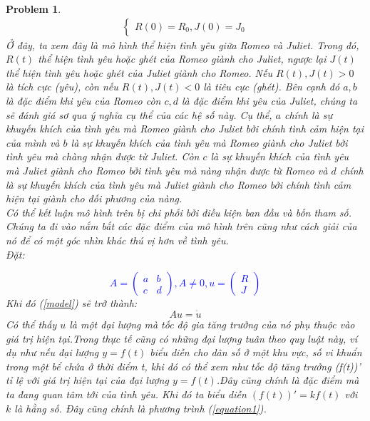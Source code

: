 \documentclass[a4paper]{article}
\newtheorem*{problem}{Problem}
\begin{document}
\begin{problem}
{\begin{align}
\begin{cases}
        R(0)=R_0,J(0)=J_0
        \end{cases}\tag{*}
    \end{align}
    }
   Ở đây, ta xem đây là mô hình thể hiện tình yêu giữa Romeo và Juliet. Trong đó, $R(t)$ thể hiện tình yêu hoặc ghét của Romeo giành cho Juliet, ngược lại $J(t)$thể hiện tình yêu hoặc ghét của Juliet giành cho Romeo. Nếu $R(t),J(t) > 0$ là tích cực (yêu), còn nếu $R(t), J(t) <0$  là tiêu cực (ghét). Bên cạnh đó $a,b$ là đặc điểm khi yêu của Romeo còn $c,d$ là đặc điểm khi yêu của Juliet, chúng ta sẽ đánh giá sơ qua ý nghĩa cụ thể của các hệ số này. Cụ thể, $a$ chính là sự khuyến khích của tình yêu mà Romeo giành cho Juliet bởi chính tình cảm hiện tại của mình và $b$ là sự khuyến khích của tình yêu mà Romeo giành cho Juliet bởi tình yêu mà chàng nhận được từ Juliet. Còn $c$ là sự khuyến khích của tình yêu mà Juliet giành cho Romeo bởi tình yêu mà nàng nhận được từ Romeo và $d$ chính là sự khuyến khích của tình yêu mà Juliet giành cho Romeo bởi chính tình cảm hiện tại giành cho đối phương của nàng.\\
Có thể kết luận mô hình trên bị chi phối bởi điều kiện ban đầu và bốn tham số. Chúng ta đi vào nắm bắt các đặc điểm của mô hình trên cũng như cách giải của nó để có một góc nhìn khác thú vị hơn về tình yêu.\\
      
    Đặt: 
    
    \textcolor{blue}{$$A=\begin{pmatrix}
   a &b\\
   c &d
\end{pmatrix},  A \ne 0 , u=\begin{pmatrix}
R \\
J
\end{pmatrix}  $$ }
Khi đó (\ref{model}) sẽ trở thành:
\begin{equation} \label{equation1}
    Au=\dot{u} 
\end{equation}
Có thể thấy $u$ là một đại lượng mà tốc độ gia tăng trưởng của nó phụ thuộc vào giá trị hiện tại.Trong thực tế cũng có những đại lượng tuân theo quy luật này, ví dụ như nếu đại lượng $y=f(t)$ biểu diễn cho dân số ở một khu vực, số vi khuẩn trong một bể chứa ở thời điểm t, khi đó có thể xem như tốc độ tăng trưởng {(f(t))}' tỉ lệ với giá trị hiện tại của đại lượng  $y=f(t)$.Đây cũng chính là đặc điểm mà ta đang quan tâm tới của tình yêu. Khi đó ta biểu diễn ${(f(t))}'=kf(t)$ với $k$ là hằng số. Đây cũng chính là phương trình (\ref{equation1}). \\
\end{problem}
\end{document}
